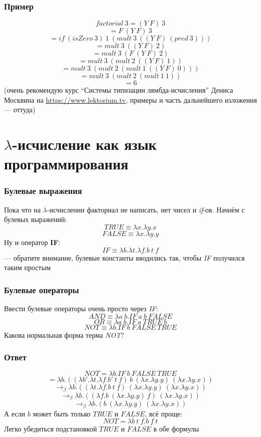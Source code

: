 \documentclass[xetex,mathserif,serif]{beamer}
\begin{document}
    \begin{frame}
        \frametitle{Пример}
        $$factorial\ 3 = (Y\ F)\ 3$$
        $$= F\ (Y\ F)\ 3$$
        $$= if\ (isZero\ 3)\ 1\ (mult\ 3\ ((Y\ F)\ (pred\ 3)))$$
        $$= mult\ 3\ ((Y\ F)\ 2)$$
        $$= mult\ 3\ (F\ (Y\ F)\ 2)$$
        $$= mult\ 3\ (mult\ 2\ ((Y\ F)\ 1))$$
        $$= mult\ 3\ (mult\ 2\ (mult\ 1\ ((Y\ F)\ 0)))$$
        $$= mult\ 3\ (mult\ 2\ (mult\ 1\ 1))$$
        $$= 6$$
        (очень рекомендую курс ``Системы типизации лямбда-исчисления'' Дениса Москвина на \url{https://www.lektorium.tv}, примеры и часть дальнейшего изложения --- оттуда)
    \end{frame}

    \section{$\lambda$-исчисление как язык программирования}

    \begin{frame}
        \frametitle{Булевые выражения}
        Пока что на $\lambda$-исчислении факториал не написать, нет чисел и \textit{if}-ов. Начнём с булевых выражений:
        $$TRUE \equiv \lambda x.\lambda y.x$$
        $$FALSE \equiv \lambda x.\lambda y.y$$
        Ну и оператор \textbf{IF}:
        $$IF \equiv \lambda b.\lambda t.\lambda f.b\ t\ f$$
        --- обратите внимание, булевые константы вводились так, чтобы \textit{IF} получился таким простым
    \end{frame}

    \begin{frame}
        \frametitle{Булевые операторы}
        Ввести булевые операторы очень просто через \textit{IF}:
        $$AND \equiv \lambda a\ b. IF\ a\ b\ FALSE$$
        $$OR \equiv \lambda a\ b. IF\ a\ TRUE\ b$$
        $$NOT \equiv \lambda b.IF\ b\ FALSE\ TRUE$$
        Какова нормальная форма терма \textit{NOT}?
    \end{frame}

    \begin{frame}
        \frametitle{Ответ}
        $$NOT = \lambda b.IF\ b\ FALSE\ TRUE$$
        $$= \lambda b.((\lambda b'.\lambda t.\lambda f.b'\ t\ f)\ b\ (\lambda x.\lambda y.y)\ (\lambda x.\lambda y.x))$$
        $$\rightarrow_\beta \lambda b.((\lambda t.\lambda f.b\ t\ f)\ (\lambda x.\lambda y.y)\ (\lambda x.\lambda y.x))$$
        $$\rightarrow_\beta \lambda b.((\lambda f.b\ (\lambda x.\lambda y.y)\ f)\ (\lambda x.\lambda y.x))$$
        $$\rightarrow_\beta \lambda b.(b\ (\lambda x.\lambda y.y)\ (\lambda x.\lambda y.x))$$
        А если $b$ может быть только $TRUE$ и $FALSE$, всё проще:
        $$NOT = \lambda b\ t\ f.b\ f\ t$$
        Легко убедиться подстановкой $TRUE$ и $FALSE$ в обе формулы
    \end{frame}
\end{document}
